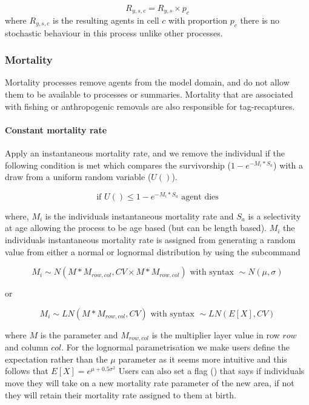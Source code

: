 \begin{equation}
R_{y,s,c} = R_{y,s} \times p_c
\end{equation}
where $R_{y,s,c}$ is the resulting agents in cell $c$ with proportion $p_c$ there is no stochastic behaviour in this process unlike other processes.

\subsubsection{Mortality}\label{sec:mortality}
Mortality processes remove agents from the model domain, and do not allow them to be available to processes or summaries. Mortality that are associated with fishing or anthropogenic removals are also responsible for tag-recaptures.

\paragraph{Constant mortality rate}
Apply an instantaneous mortality rate, and we remove the individual if the following condition is met which compares the survivorship ($1 - e^{-M_i * S_a}$) with a draw from a uniform random variable ($U()$).

\begin{equation}\label{constan_mort}
\text{if } U() \leq 1 - e^{-M_i * S_a} \text{ agent dies}
\end{equation}

where, $M_i$ is the individuals instantaneous mortality rate and $S_a$ is a selectivity at age allowing the process to be age based (but can be length based). $M_i$ the individuals instantaneous mortality rate is assigned from generating a random value from either a normal or lognormal distribution by using the subcommand 

\begin{equation}\label{constan_mort_assign}
M_i \sim N(M * M_{row,col}, CV\times M * M_{row,col}) \text{ with syntax } \sim N(\mu,\sigma)
\end{equation}

or 

\begin{equation}\label{constan_mort_assign_ln}
M_i \sim LN(M * M_{row,col}, CV) \text{ with syntax } \sim LN(E[X],CV)
\end{equation}

where $M$ is the parameter  and $M_{row,col}$ is the multiplier layer value in row $row$ and column $col$. For the lognormal parametrisation we make users define the expectation rather than the $\mu$ parameter as it seems more intuitive and this follows that $E[X] = e^{\mu + 0.5\sigma^2}$ Users can also set a flag () that says if individuals move they will take on a new mortality rate parameter of the new area, if not they will retain their mortality rate assigned to them at birth.

